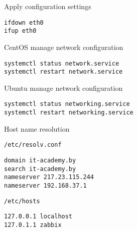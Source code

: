 \begin{frame}[fragile]{Apply configuration settings}
    \begin{lstlisting}
ifdown eth0
ifup eth0
    \end{lstlisting}
    CentOS manage network configuration
    \begin{lstlisting}
systemctl status network.service
systemctl restart network.service
    \end{lstlisting}
    Ubuntu manage network configuration
    \begin{lstlisting}
systemctl status networking.service
systemctl restart networking.service
    \end{lstlisting}
\end{frame}


\begin{frame}[fragile]{Host name resolution}
\begin{block}{ {\tt /etc/resolv.conf}}
        \begin{lstlisting}
domain it-academy.by
search it-academy.by
nameserver 217.23.115.244
nameserver 192.168.37.1
        \end{lstlisting}
    \end{block}
\begin{block}{ {\tt /etc/hosts} }
        \begin{lstlisting}
127.0.0.1 localhost
127.0.1.1 zabbix
        \end{lstlisting}
\end{block}
\end{frame}
